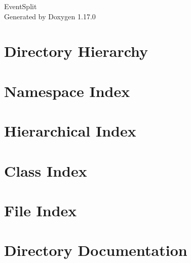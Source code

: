 \documentclass[twoside]{book}
\newcommand{\+}{\discretionary{\mbox{\scriptsize$\hookleftarrow$}}{}{}}
\newcommand{\clearemptydoublepage}{%
    \newpage{\pagestyle{empty}\cleardoublepage}%
  }
\begin{document}
  \raggedbottom
    \hypersetup{pageanchor=false,
                bookmarksnumbered=true,
                pdfencoding=unicode
               }
  \begin{titlepage}
  \vspace*{7cm}
  \begin{center}%
  {\Large Event\+Split}\\
  \vspace*{1cm}
  {\large Generated by Doxygen 1.17.0}\\
  \end{center}
  \end{titlepage}
  \clearemptydoublepage
  \tableofcontents
  \clearemptydoublepage
  \hypersetup{pageanchor=true}
\chapter{Directory Hierarchy}

\chapter{Namespace Index}

\chapter{Hierarchical Index}

\chapter{Class Index}

\chapter{File Index}

\chapter{Directory Documentation}












\end{document}
